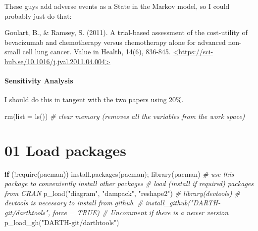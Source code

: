 \documentclass[
]{article}
\newenvironment{Shaded}{\begin{snugshade}}{\end{snugshade}}
\newcommand{\AttributeTok}[1]{\textcolor[rgb]{0.77,0.63,0.00}{#1}}
\newcommand{\CommentTok}[1]{\textcolor[rgb]{0.56,0.35,0.01}{\textit{#1}}}
\newcommand{\ControlFlowTok}[1]{\textcolor[rgb]{0.13,0.29,0.53}{\textbf{#1}}}
\newcommand{\FunctionTok}[1]{\textcolor[rgb]{0.00,0.00,0.00}{#1}}
\newcommand{\NormalTok}[1]{#1}
\newcommand{\SpecialCharTok}[1]{\textcolor[rgb]{0.00,0.00,0.00}{#1}}
\newcommand{\StringTok}[1]{\textcolor[rgb]{0.31,0.60,0.02}{#1}}
\begin{document}
These guys add adverse events as a State in the Markov model, so I could
probably just do that:

Goulart, B., \& Ramsey, S. (2011). A trial-based assessment of the
cost-utility of bevacizumab and chemotherapy versus chemotherapy alone
for advanced non-small cell lung cancer. Value in Health, 14(6),
836-845.
\href{https://sci-hub.se/10.1016/j.jval.2011.04.004}{\textless https://sci-hub.se/10.1016/j.jval.2011.04.004\textgreater{}}

\hypertarget{sensitivity-analysis}{%
\paragraph{Sensitivity Analysis}\label{sensitivity-analysis}}

I should do this in tangent with the two papers using 20\%.

\begin{Shaded}
\begin{Highlighting}[]
\FunctionTok{rm}\NormalTok{(}\AttributeTok{list =} \FunctionTok{ls}\NormalTok{())  }
\CommentTok{\# clear memory (removes all the variables from the work space)}
\end{Highlighting}
\end{Shaded}

\hypertarget{load-packages}{%
\section{01 Load packages}\label{load-packages}}

\begin{Shaded}
\begin{Highlighting}[]
\ControlFlowTok{if}\NormalTok{ (}\SpecialCharTok{!}\FunctionTok{require}\NormalTok{(}\StringTok{\textquotesingle{}pacman\textquotesingle{}}\NormalTok{)) }\FunctionTok{install.packages}\NormalTok{(}\StringTok{\textquotesingle{}pacman\textquotesingle{}}\NormalTok{); }\FunctionTok{library}\NormalTok{(pacman) }
\CommentTok{\# use this package to conveniently install other packages}
\CommentTok{\# load (install if required) packages from CRAN}
\FunctionTok{p\_load}\NormalTok{(}\StringTok{"diagram"}\NormalTok{, }\StringTok{"dampack"}\NormalTok{, }\StringTok{"reshape2"}\NormalTok{)}
\CommentTok{\# library(devtools) \# devtools is necessary to install from github.}
\CommentTok{\# install\_github("DARTH{-}git/darthtools", force = TRUE) \# Uncomment if there is a newer version}
\FunctionTok{p\_load\_gh}\NormalTok{(}\StringTok{"DARTH{-}git/darthtools"}\NormalTok{)}
\end{Highlighting}
\end{Shaded}
\end{document}
